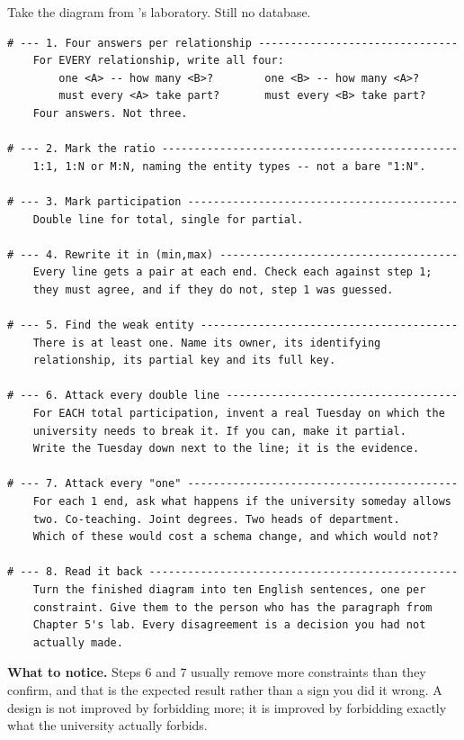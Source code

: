 \begin{lab}
Take the diagram from 's laboratory. Still no database.

\begin{lstlisting}
# --- 1. Four answers per relationship -------------------------------
    For EVERY relationship, write all four:
        one <A> -- how many <B>?        one <B> -- how many <A>?
        must every <A> take part?       must every <B> take part?
    Four answers. Not three.

# --- 2. Mark the ratio ----------------------------------------------
    1:1, 1:N or M:N, naming the entity types -- not a bare "1:N".

# --- 3. Mark participation ------------------------------------------
    Double line for total, single for partial.

# --- 4. Rewrite it in (min,max) -------------------------------------
    Every line gets a pair at each end. Check each against step 1;
    they must agree, and if they do not, step 1 was guessed.

# --- 5. Find the weak entity ----------------------------------------
    There is at least one. Name its owner, its identifying
    relationship, its partial key and its full key.

# --- 6. Attack every double line ------------------------------------
    For EACH total participation, invent a real Tuesday on which the
    university needs to break it. If you can, make it partial.
    Write the Tuesday down next to the line; it is the evidence.

# --- 7. Attack every "one" ------------------------------------------
    For each 1 end, ask what happens if the university someday allows
    two. Co-teaching. Joint degrees. Two heads of department.
    Which of these would cost a schema change, and which would not?

# --- 8. Read it back ------------------------------------------------
    Turn the finished diagram into ten English sentences, one per
    constraint. Give them to the person who has the paragraph from
    Chapter 5's lab. Every disagreement is a decision you had not
    actually made.
\end{lstlisting}

\smallskip
\textbf{What to notice.} Steps 6 and 7 usually remove more constraints than
they confirm, and that is the expected result rather than a sign you did it
wrong. A design is not improved by forbidding more; it is improved by
forbidding exactly what the university actually forbids.
\end{lab}

